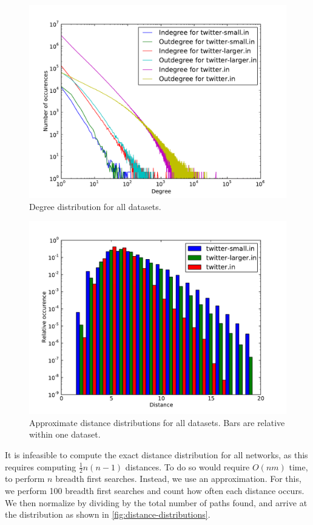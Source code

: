 \documentclass[a4paper,10pt,hidelinks]{article}
\begin{document}
\begin{figure}
	\centering
	\includegraphics[scale=0.8]{degree-distributions.pdf}
	\caption{Degree distribution for all datasets.}
	\label{fig:degree-distributions}
\end{figure}

\begin{figure}
	\centering
	\includegraphics[scale=0.8]{distance-distribution}
	\caption{Approximate distance distributions for all datasets. Bars are relative within one dataset.}
	\label{fig:distance-distributions}
\end{figure}

It is infeasible to compute the exact distance distribution for all networks, as this requires computing $\frac{1}{2} n (n-1)$ distances. To do so would require $O(nm)$ time, to perform $n$ breadth first searches. Instead, we use an approximation. For this, we perform 100 breadth first searches and count how often each distance occurs. We then normalize by dividing by the total number of paths found, and arrive at the distribution as shown in \autoref{fig:distance-distributions}.
\end{document}
